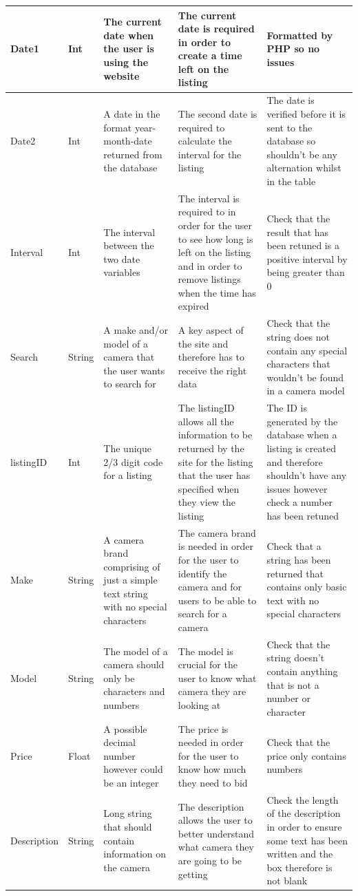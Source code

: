 \begin{center}
\begin{longtable}{|P{1.7cm}|P{1cm}|P{3.5cm}|P{3cm}|P{3cm}|}
        Date1 & Int & The current date when the user is using the website & The current date is required in order to create a time left on the listing & Formatted by PHP so no issues \\ \hline
        Date2 & Int & A date in the format year-month-date returned from the database & The second date is required to calculate the interval for the listing & The date is verified before it is sent to the database so shouldn’t be any alternation whilst in the table \\ \hline
        Interval & Int & The interval between the two date variables & The interval is required to in order for the user to see how long is left on the listing and in order to remove listings when the time has expired & Check that the result that has been retuned is a positive interval by being greater than 0 \\ \hline
        Search & String & A make and/or model of a camera that the user wants to search for & A key aspect of the site and therefore has to receive the right data & Check that the string does not contain any special characters that wouldn’t be found in a camera model \\ \hline
        listingID & Int & The unique 2/3 digit code for a listing & The listingID allows all the information to be returned by the site for the listing that the user has specified when they view the listing & The ID is generated by the database when a listing is created and therefore shouldn’t have any issues however check a number has been retuned \\ \hline
        Make & String & A camera brand comprising of just a simple text string with no special characters & The camera brand is needed in order for the user to identify the camera and for users to be able to search for a camera & Check that a string has been returned that contains only basic text with no special characters \\ \hline
        Model & String & The model of a camera should only be characters and numbers & The model is crucial for the user to know what camera they are looking at & Check that the string doesn’t contain anything that is not a number or character \\ \hline
        Price & Float & A possible decimal number however could be an integer & The price is needed in order for the user to know how much they need to bid & Check that the price only contains numbers \\ \hline
        Description & String & Long string that should contain information on the camera & The description allows the user to better understand what camera they are going to be getting & Check the length of the description in order to ensure some text has been written and the box therefore is not blank \\ \hline

\end{longtable}
\end{center}
